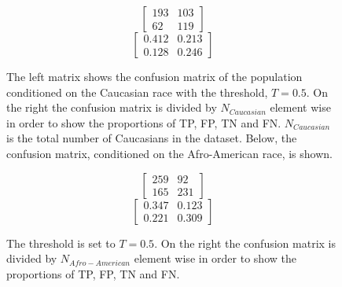 \documentclass[11pt, fleqn, titlepage]{article}
\begin{document}
	\begin{figure}[h!]	
	\begin{multicols}{2}
		\begin{ceqn}
		\begin{equation*}
		\begin{bmatrix}
		193 & 103  \\
		62 & 119 
		\end{bmatrix} 
		\end{equation*} 
		\begin{equation*}
		\begin{bmatrix}
		0.412 & 0.213  \\
		0.128 & 0.246 
		\end{bmatrix} 
		\end{equation*}
		\end{ceqn}
	\end{multicols}
	{The left matrix shows the confusion matrix of the population conditioned on the Caucasian race with the threshold, $ T = 0.5 $. On the right the confusion matrix is divided by $ N_{Caucasian} $ element wise in order to show the proportions of TP, FP, TN and FN. $ N_{Caucasian} $ is the total number of Caucasians in the dataset. Below, the confusion matrix, conditioned on the Afro-American race, is shown.}
	\end{figure}
	\begin{figure}[h!]	
		\begin{multicols}{2}
			\begin{ceqn}
			\begin{equation*}
			\begin{bmatrix}
			259 & 92  \\
			165 & 231 
			\end{bmatrix} 
			\end{equation*} 
			\begin{equation*}
			\begin{bmatrix}
			0.347 & 0.123 \\
			0.221 & 0.309 
			\end{bmatrix} 
			\end{equation*}
			\end{ceqn}
		\end{multicols}
		{The threshold is set to $ T = 0.5 $. On the right the confusion matrix is divided by $ N_{Afro-American} $ element wise in order to show the proportions of TP, FP, TN and FN.}
	\end{figure}
	
\end{document}
